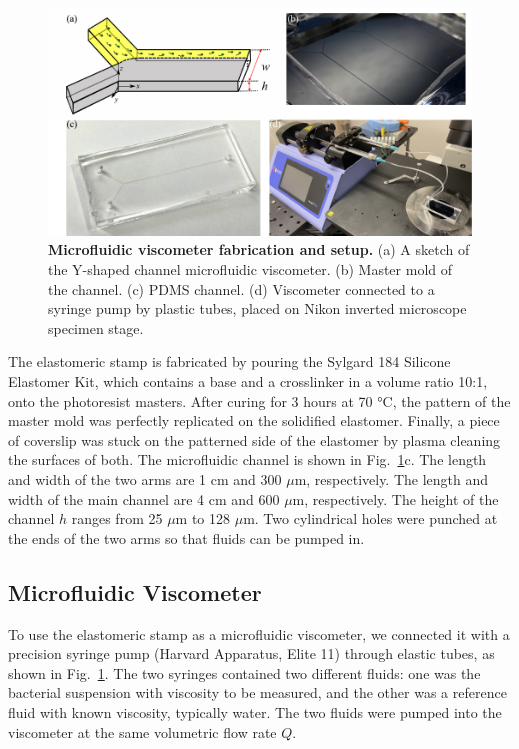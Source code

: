 \begin{figure}[!ht]
	\begin{center}
	\includegraphics[width=5.5 in]{Figs/2-Exp/7.pdf}
	\end{center}
	\caption[Microfluidic viscometer fabrication and setup.]
	{
	\textbf{Microfluidic viscometer fabrication and setup.}
	(a) A sketch of the Y-shaped channel microfluidic viscometer.
	(b) Master mold of the channel.
	(c) PDMS channel.
	(d) Viscometer connected to a syringe pump by plastic tubes, placed on Nikon inverted microscope specimen stage.
	}
	\label{fig:experiment-microfluidics}
\end{figure}

The elastomeric stamp is fabricated by pouring the Sylgard 184 Silicone Elastomer Kit, which contains a base and a crosslinker in a volume ratio 10:1, onto the photoresist masters. After curing for 3 hours at 70 °C, the pattern of the master mold was perfectly replicated on the solidified elastomer. Finally, a piece of coverslip was stuck on the patterned side of the elastomer by plasma cleaning the surfaces of both. The microfluidic channel is shown in Fig.~\ref{fig:experiment-microfluidics}c. The length and width of the two arms are 1 cm and 300 $\mu$m, respectively. The length and width of the main channel are 4 cm and 600 $\mu$m, respectively. The height of the channel $h$ ranges from 25 $\mu$m to 128 $\mu$m. Two cylindrical holes were punched at the ends of the two arms so that fluids can be pumped in.

\subsection{Microfluidic Viscometer}


To use the elastomeric stamp as a microfluidic viscometer, we connected it with a precision syringe pump (Harvard Apparatus, Elite 11) through elastic tubes, as shown in Fig.~\ref{fig:experiment-microfluidics}. The two syringes contained two different fluids: one was the bacterial suspension with viscosity to be measured, and the other was a reference fluid with known viscosity, typically water. The two fluids were pumped into the viscometer at the same volumetric flow rate $Q$.

